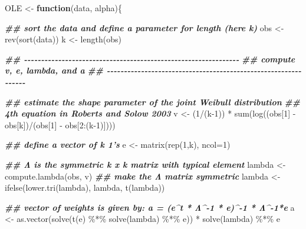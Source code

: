 \documentclass[
]{article}
\newenvironment{Shaded}{\begin{snugshade}}{\end{snugshade}}
\newcommand{\AttributeTok}[1]{\textcolor[rgb]{0.77,0.63,0.00}{#1}}
\newcommand{\ControlFlowTok}[1]{\textcolor[rgb]{0.13,0.29,0.53}{\textbf{#1}}}
\newcommand{\DecValTok}[1]{\textcolor[rgb]{0.00,0.00,0.81}{#1}}
\newcommand{\DocumentationTok}[1]{\textcolor[rgb]{0.56,0.35,0.01}{\textbf{\textit{#1}}}}
\newcommand{\FunctionTok}[1]{\textcolor[rgb]{0.00,0.00,0.00}{#1}}
\newcommand{\NormalTok}[1]{#1}
\newcommand{\OtherTok}[1]{\textcolor[rgb]{0.56,0.35,0.01}{#1}}
\newcommand{\SpecialCharTok}[1]{\textcolor[rgb]{0.00,0.00,0.00}{#1}}
\begin{document}
\begin{Shaded}
\begin{Highlighting}[]
\NormalTok{OLE }\OtherTok{\textless{}{-}} \ControlFlowTok{function}\NormalTok{(data, alpha)\{}
    
    \DocumentationTok{\#\# sort the data and define a parameter for length (here k)}
\NormalTok{    obs }\OtherTok{\textless{}{-}} \FunctionTok{rev}\NormalTok{(}\FunctionTok{sort}\NormalTok{(data))}
\NormalTok{    k   }\OtherTok{\textless{}{-}} \FunctionTok{length}\NormalTok{(obs)}
    
    \DocumentationTok{\#\# {-}{-}{-}{-}{-}{-}{-}{-}{-}{-}{-}{-}{-}{-}{-}{-}{-}{-}{-}{-}{-}{-}{-}{-}{-}{-}{-}{-}{-}{-}{-}{-}{-}{-}{-}{-}{-}{-}{-}{-}{-}{-}{-}{-}{-}{-}{-}{-}{-}{-}{-}{-}{-}{-}{-}{-}{-}{-}{-}{-}{-}{-}{-}}
    \DocumentationTok{\#\# compute v, e, lambda, and a}
    \DocumentationTok{\#\# {-}{-}{-}{-}{-}{-}{-}{-}{-}{-}{-}{-}{-}{-}{-}{-}{-}{-}{-}{-}{-}{-}{-}{-}{-}{-}{-}{-}{-}{-}{-}{-}{-}{-}{-}{-}{-}{-}{-}{-}{-}{-}{-}{-}{-}{-}{-}{-}{-}{-}{-}{-}{-}{-}{-}{-}{-}{-}{-}{-}{-}{-}{-}}
    
    \DocumentationTok{\#\# estimate the shape parameter of the joint Weibull distribution }
    \DocumentationTok{\#\# 4th equation in Roberts and Solow 2003}
\NormalTok{    v }\OtherTok{\textless{}{-}}\NormalTok{ (}\DecValTok{1}\SpecialCharTok{/}\NormalTok{(k}\DecValTok{{-}1}\NormalTok{)) }\SpecialCharTok{*} \FunctionTok{sum}\NormalTok{(}\FunctionTok{log}\NormalTok{((obs[}\DecValTok{1}\NormalTok{] }\SpecialCharTok{{-}}\NormalTok{ obs[k])}\SpecialCharTok{/}\NormalTok{(obs[}\DecValTok{1}\NormalTok{] }\SpecialCharTok{{-}}\NormalTok{ obs[}\DecValTok{2}\SpecialCharTok{:}\NormalTok{(k}\DecValTok{{-}1}\NormalTok{)])))}
    
    \DocumentationTok{\#\# define a vector of k 1’s}
\NormalTok{    e }\OtherTok{\textless{}{-}} \FunctionTok{matrix}\NormalTok{(}\FunctionTok{rep}\NormalTok{(}\DecValTok{1}\NormalTok{,k), }\AttributeTok{ncol=}\DecValTok{1}\NormalTok{)}
    
    \DocumentationTok{\#\# Λ is the symmetric k x k matrix with typical element}
\NormalTok{    lambda }\OtherTok{\textless{}{-}} \FunctionTok{compute.lambda}\NormalTok{(obs, v)}
    \DocumentationTok{\#\# make the Λ matrix symmetric}
\NormalTok{    lambda }\OtherTok{\textless{}{-}} \FunctionTok{ifelse}\NormalTok{(}\FunctionTok{lower.tri}\NormalTok{(lambda), lambda, }\FunctionTok{t}\NormalTok{(lambda)) }
    
    \DocumentationTok{\#\# vector of weights is given by: a = (e\^{}t * Λ\^{}{-}1 * e)\^{}{-}1 * Λ\^{}{-}1*e}
\NormalTok{    a      }\OtherTok{\textless{}{-}} \FunctionTok{as.vector}\NormalTok{(}\FunctionTok{solve}\NormalTok{(}\FunctionTok{t}\NormalTok{(e) }\SpecialCharTok{\%*\%} \FunctionTok{solve}\NormalTok{(lambda) }\SpecialCharTok{\%*\%}\NormalTok{ e)) }\SpecialCharTok{*} \FunctionTok{solve}\NormalTok{(lambda) }\SpecialCharTok{\%*\%}\NormalTok{ e}
    

\end{Highlighting}
\end{Shaded}
\end{document}
